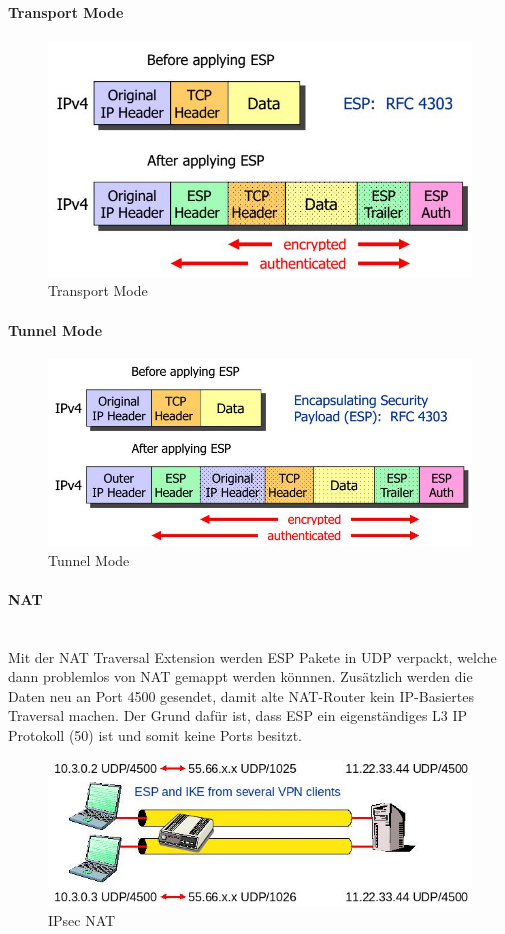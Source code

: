 \paragraph{Transport Mode}\hfill
\begin{figure}[h!]
\centering
\includegraphics[width=0.5\linewidth]{images/ipsec_esp}
\caption{Transport Mode}
\label{fig:ipsecesp}
\end{figure}

\paragraph{Tunnel Mode}\hfill
\begin{figure}[h!]
	\centering
	\includegraphics[width=0.7\linewidth]{images/ipsec_esp_tunnel}
	\caption{Tunnel Mode}
	\label{fig:ipsecesptunnel}
\end{figure}


\paragraph{NAT} \hfill \\
Mit der NAT Traversal Extension werden ESP Pakete in UDP verpackt, welche dann problemlos von NAT gemappt werden könnnen. Zusätzlich werden die Daten neu an Port 4500 gesendet, damit alte NAT-Router kein IP-Basiertes Traversal machen. Der Grund dafür ist, dass ESP ein eigenständiges L3 IP Protokoll (50) ist und somit keine Ports besitzt.
\begin{figure}[h]
\centering
\includegraphics[width=0.5\linewidth]{images/ipsec_nat}
\caption{IPsec NAT}
\label{fig:ipsecnat}
\end{figure}

